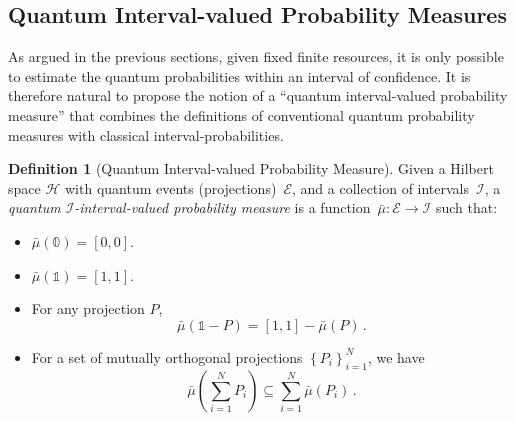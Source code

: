 \documentclass[12pt]{iopart}
\theoremstyle{plain}
\theoremstyle{definition}
\newtheorem{definition}[thm]{Definition}
\theoremstyle{remark}
\newcommand{\Hilb}{\mathcal{H}}
\newcommand{\events}{\ensuremath{\mathcal{E}}}
\begin{document}


\subsection{Quantum Interval-valued Probability Measures}

As argued in the previous sections, given fixed finite resources,
it is only possible to estimate the quantum probabilities within an
interval of confidence. It is therefore natural to propose the notion
of a ``quantum interval-valued probability measure'' that combines
the definitions of conventional quantum probability measures with
classical interval-probabilities.

\begin{definition}[Quantum Interval-valued Probability Measure]\label{def:QuantumInterval-valuedProbability}
Given a Hilbert space $\Hilb$ with quantum events (projections)~$\events$,
and a collection of intervals~$\mathscr{I}$, a \emph{quantum $\mathscr{I}$-interval-valued
probability measure} is a function~$\bar{\mu}:\events\rightarrow\mathscr{I}$
such that: 
\begin{itemize}
\item $\bar{\mu}(\mathbb{0})=\left[0,0\right]$. 
\item $\bar{\mu}(\mathbb{1})=\left[1,1\right]$. 
\item For any projection $P$, 
\begin{equation}
\bar{\mu}\left(\mathbb{1}-P\right)=\left[1,1\right]-\bar{\mu}\left(P\right)\,.\label{eq:QuantumInterval-valuedProbability-Complement}
\end{equation}
\item For a set of mutually orthogonal projections $\left\{ P_{i}\right\} _{i=1}^{N}$,
we have 
\begin{equation}
\bar{\mu}\left(\sum_{i=1}^{N}P_{i}\right)\subseteq\sum_{i=1}^{N}\bar{\mu}\left(P_{i}\right)\,.\label{eq:QuantumInterval-valuedProbability-Inclusion}
\end{equation}
\end{itemize}
\end{definition}
\end{document}
